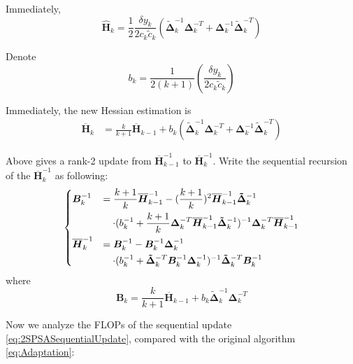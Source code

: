 \documentclass[conference]{IEEEtran}
\newcommand{\bDelta}{\bm{\Delta}}
\newcommand{\oH}{\bm{\overline{H}}}
\newcommand{\hH}{\bm{\hat{H}}}
\newcommand{\tDelta}{\bm{\tilde{\Delta}}}
\begin{document}
Immediately,
\begin{equation} \label{eq:HHat}
\hH_k=\frac{1}{2}\frac{\delta y_k}{2c_k\tilde{c}_k}\left( \tDelta_k^{-1}\bDelta_k^{-T}+\bDelta_k^{-1}\tDelta_k^{-T} \right)
\end{equation}

Denote
\begin{equation}
b_k=\frac{1}{2(k+1)}(\frac{\delta y_k}{2c_k\tilde{c}_k})
\end{equation}

Immediately, the new Hessian estimation is
\begin{align*}
\oH_k
&=\frac{k}{k+1}\oH_{k-1}+b_k(\tDelta_k^{-1}\bDelta_k^{-T}+\bDelta_k^{-1}\tDelta_k^{-T})
\end{align*}

Above gives a rank-2 update from $ \oH_{k-1}^{-1} $ to $ \oH_{k}^{-1} $. Write the sequential recursion of the $ \oH_k^{-1} $ as following:
\begin{equation} \label{eq:2SPSASequentialUpdate}
\begin{dcases}
\bm{B}_k^{-1}
&=\frac{k+1}{k}\oH_{k-1}^{-1}-(\frac{k+1}{k})^2\oH_{k-1}^{-1}\tDelta_k^{-1}\\
&~~~\cdot(b_k^{-1}+\frac{k+1}{k}\bDelta_k^{-T}\oH_{k-1}^{-1}\tDelta_k^{-1})^{-1}\bDelta_k^{-T}\oH_{k-1}^{-1}\\
\oH_k^{-1}
&=\bm{B}_k^{-1}-\bm{B}_k^{-1}\bDelta_k^{-1}\\
&~~~\cdot(b_k^{-1}+\tDelta_k^{-T}\bm{B}_k^{-1}\bDelta_k^{-1})^{-1}\tDelta_k^{-T}\bm{B}_k^{-1}
\end{dcases}
\end{equation}
where
\begin{equation}\label{eq:2SPSAB}
\bm{B}_k=\frac{k}{k+1}\oH_{k-1}+b_k\tDelta_k^{-1}\bDelta_k^{-T}
\end{equation}

Now we analyze the FLOPs of the sequential update \ref{eq:2SPSASequentialUpdate}, compared with the original algorithm \ref{eq:Adaptation}:
\end{document}
